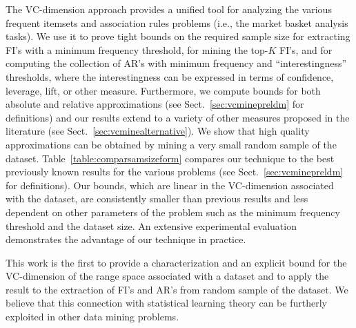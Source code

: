 The VC-dimension approach provides a unified tool for analyzing the various
frequent itemsets and association rules problems (i.e., the market basket
analysis tasks). We use it to prove tight bounds on the required
sample size for extracting FI's with a minimum frequency threshold, for mining
the top-$K$ FI's, and for computing the collection of AR's with minimum
frequency and ``interestingness'' thresholds, where the interestingness can be
expressed in terms of confidence, leverage, lift, or other measure.
Furthermore, we compute bounds for both absolute and relative approximations
(see
Sect.~\ref{sec:vcminepreldm} for definitions) and our results extend to a variety
of other measures proposed in the literature (see Sect.~\ref{sec:vcminealternative}).
We show that high quality approximations can be obtained by mining a very small
random sample of the dataset. Table~\ref{table:comparsamsizeform} compares our
technique to the best previously known results for the various problems (see
Sect.~\ref{sec:vcminepreldm} for definitions). Our bounds, which are linear in the
VC-dimension associated with the dataset, are consistently smaller than previous
results and less dependent on other parameters of the problem such as the
minimum frequency threshold and the dataset size. An extensive
experimental evaluation demonstrates the advantage of our technique in practice.

This work is the first to provide a characterization and an explicit bound for
the VC-dimension of the range space associated with a dataset and to apply the
result to the extraction of FI's and AR's from random sample of the dataset. We
believe that this connection with statistical learning theory can be furtherly
exploited in other data mining problems.

